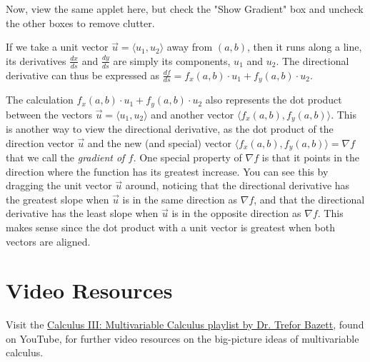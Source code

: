 \documentclass{ximera}
\begin{document}
Now, view the same applet here, but check the "Show Gradient" box and uncheck the other boxes to remove clutter.

\begin{center}
\end{center}

If we take a unit vector $\vec u=\langle u_1,u_2\rangle$ away from $(a,b)$, then it runs along a line, its derivatives $\frac{dx}{ds}$ and $\frac{dy}{ds}$ are simply its components, $u_1$ and $u_2$. The directional derivative can thus be expressed as $\frac{df}{ds}=f_x(a,b)\cdot u_1+f_y(a,b)\cdot u_2$.

The calculation $f_x(a,b)\cdot u_1+f_y(a,b)\cdot u_2$ also represents the dot product between the vectors $\vec u=\langle u_1,u_2\rangle$ and another vector $\langle f_x(a,b) , f_y(a,b)\rangle$. This is another way to view the directional derivative, as the dot product of the direction vector $\vec u$ and the new (and special) vector $\langle f_x(a,b) , f_y(a,b)\rangle=\nabla f$ that we call the \emph{gradient of $f$.} One special property of $\nabla f$ is that it points in the direction where the function has its greatest increase. You can see this by dragging the unit vector $\vec u$ around, noticing that the directional derivative has the greatest slope when $\vec u$ is in the same direction as $\nabla f$, and that the directional derivative has the least slope when $\vec u$ is in the opposite direction as $\nabla f$. This makes sense since the dot product with a unit vector is greatest when both vectors are aligned.

\section{Video Resources}


Visit the \href{https://www.youtube.com/playlist?list=PLHXZ9OQGMqxc_CvEy7xBKRQr6I214QJcd}{Calculus III: Multivariable Calculus playlist by Dr. Trefor Bazett}, found on YouTube, for further video resources on the big-picture ideas of multivariable calculus.
\end{document}
